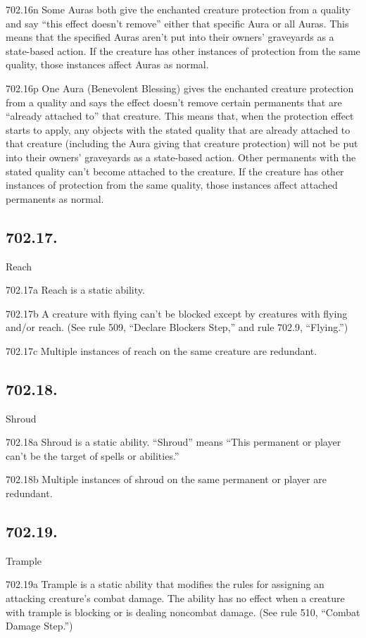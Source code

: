 702.16n Some Auras both give the enchanted creature protection from a quality and say “this effect doesn’t remove” either that specific Aura or all Auras. This means that the specified Auras aren’t put into their owners’ graveyards as a state-based action. If the creature has other instances of protection from the same quality, those instances affect Auras as normal.

702.16p One Aura (Benevolent Blessing) gives the enchanted creature protection from a quality and says the effect doesn’t remove certain permanents that are “already attached to” that creature. This means that, when the protection effect starts to apply, any objects with the stated quality that are already attached to that creature (including the Aura giving that creature protection) will not be put into their owners’ graveyards as a state-based action. Other permanents with the stated quality can’t become attached to the creature. If the creature has other instances of protection from the same quality, those instances affect attached permanents as normal.

\subsection*{702.17.}
Reach

702.17a Reach is a static ability.

702.17b A creature with flying can’t be blocked except by creatures with flying and/or reach. (See rule 509, “Declare Blockers Step,” and rule 702.9, “Flying.”)

702.17c Multiple instances of reach on the same creature are redundant.

\subsection*{702.18.}
Shroud

702.18a Shroud is a static ability. “Shroud” means “This permanent or player can’t be the target of spells or abilities.”

702.18b Multiple instances of shroud on the same permanent or player are redundant.

\subsection*{702.19.}
Trample

702.19a Trample is a static ability that modifies the rules for assigning an attacking creature’s combat damage. The ability has no effect when a creature with trample is blocking or is dealing noncombat damage. (See rule 510, “Combat Damage Step.”)

